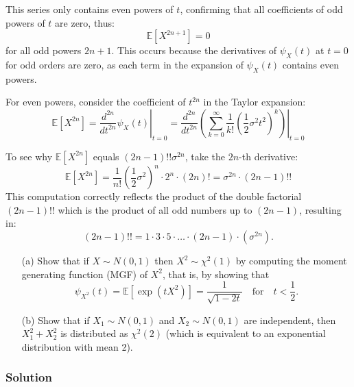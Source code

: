\documentclass{article}
\begin{document}
\begin{enumerate}[label=(\alph*)]
    This series only contains even powers of \( t \), confirming that all coefficients of odd powers of \( t \) are zero, thus:
    \[
    \mathbb{E}[X^{2n+1}] = 0
    \]
    for all odd powers \( 2n+1 \). This occurs because the derivatives of \( \psi_X(t) \) at \( t=0 \) for odd orders are zero, as each term in the expansion of \( \psi_X(t) \) contains even powers.
    
    For even powers, consider the coefficient of \( t^{2n} \) in the Taylor expansion:
    \[
    \mathbb{E}[X^{2n}] = \left. \frac{d^{2n}}{dt^{2n}} \psi_X(t) \right|_{t=0} = \left. \frac{d^{2n}}{dt^{2n}} \left( \sum_{k=0}^{\infty} \frac{1}{k!} \left(\frac{1}{2}\sigma^2 t^2\right)^k \right) \right|_{t=0}
    \]
    
    To see why \( \mathbb{E}[X^{2n}] \) equals \((2n-1)!! \sigma^{2n}\), take the \(2n\)-th derivative:
    \[
    \mathbb{E}[X^{2n}] = \frac{1}{n!} \left(\frac{1}{2} \sigma^2\right)^n \cdot 2^n \cdot (2n)! = \sigma^{2n} \cdot (2n-1)!!
    \]
    This computation correctly reflects the product of the double factorial \((2n-1)!!\) which is the product of all odd numbers up to \((2n-1)\), resulting in:
    \[
    (2n-1)!! = 1 \cdot 3 \cdot 5 \cdot \ldots \cdot (2n-1) \cdot (\sigma^{2n}).
    \]
    
\end{enumerate}

\exercise

\begin{itemize}
    \item[(a)] Show that if \( X \sim N(0, 1) \) then \( X^2 \sim \chi^2(1) \) by computing the moment generating function (MGF) of \( X^2 \), that is, by showing that
    \[
    \psi_{X^2}(t) = \mathbb{E}[\exp(tX^2)] = \frac{1}{\sqrt{1-2t}} \quad \text{for} \quad t < \frac{1}{2}.
    \]

    \item[(b)] Show that if \( X_1 \sim N(0, 1) \) and \( X_2 \sim N(0, 1) \) are independent, then \( X_1^2 + X_2^2 \) is distributed as \( \chi^2(2) \) (which is equivalent to an exponential distribution with mean 2).
\end{itemize}


\subsubsection*{Solution}
\end{document}
